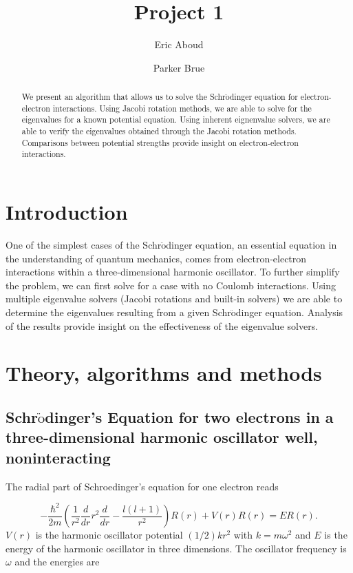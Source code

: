 \documentclass[%
reprint,
superscriptaddress,
showpacs,
nofootinbib,
bibnotes,amsmath,amssymb,aps,
prc, 
]{revtex4-1}
\begin{document}
	\title{Project 1}
	\author{Eric Aboud}
	\author{Parker Brue}
	\begin{abstract}
	We present an algorithm that allows us to solve the Schr$\ddot{\textrm{o}}$dinger equation for electron-electron interactions.  Using Jacobi rotation methods, we are able to solve for the eigenvalues for a known potential equation.  Using inherent eignenvalue solvers, we are able to verify the eigenvalues obtained through the Jacobi rotation methods.  Comparisons between potential strengths provide insight on electron-electron interactions.
	\end{abstract}
	\maketitle
	
	
	\section{Introduction}
	
	One of the simplest cases of the Schr$\ddot{\textrm{o}}$dinger equation, an essential equation in the understanding of quantum mechanics, comes from electron-electron interactions within a three-dimensional harmonic oscillator.  To further simplify the problem, we can first solve for a case with no Coulomb interactions.  Using multiple eigenvalue solvers (Jacobi rotations and built-in solvers) we are able to determine the eigenvalues resulting from a given Schr$\ddot{\textrm{o}}$dinger equation.  Analysis of the results provide insight on the effectiveness of the eigenvalue solvers.
	
	
	\section{Theory, algorithms and methods}
	\subsection{Schr$\ddot{\textrm{o}}$dinger's Equation for two electrons in a three-dimensional harmonic oscillator well, noninteracting}	
The radial part of Schroedinger's equation for one electron reads

\begin{equation*}
-\frac{\hbar^2}{2 m} \left ( \frac{1}{r^2} \frac{d}{dr} r^2
\frac{d}{dr} - \frac{l (l + 1)}{r^2} \right )R(r) 
+ V(r) R(r) = E R(r).
\end{equation*}
$V(r)$ is the harmonic oscillator potential $(1/2)kr^2$ with
$k=m\omega^2$ and $E$ is
the energy of the harmonic oscillator in three dimensions.
The oscillator frequency is $\omega$ and the energies are
\end{document}

